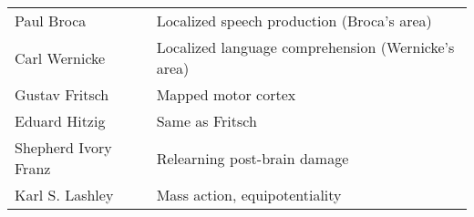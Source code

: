 \begin{landscape}
\begin{table}[h]
\begin{tabular}{p{5.2cm}p{9.5cm}}
            Paul Broca            & Localized speech production (Broca's area)                                 \\
            Carl Wernicke         & Localized language comprehension (Wernicke's area)                         \\
            Gustav Fritsch        & Mapped motor cortex                                                        \\
            Eduard Hitzig         & Same as Fritsch                                                            \\
            Shepherd Ivory Franz  & Relearning post-brain damage                                               \\
            Karl S. Lashley       & Mass action, equipotentiality                                              \\
            \bottomrule
        \end{tabular}

    \end{table}
    \vfill

\end{landscape}